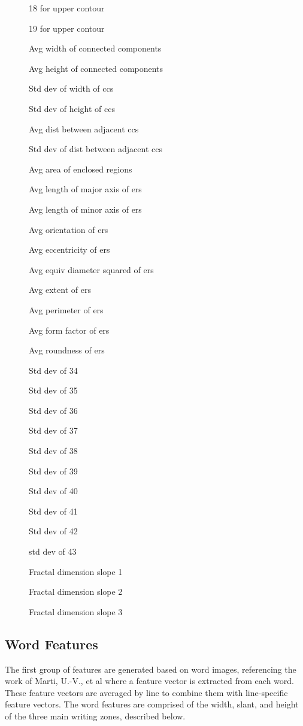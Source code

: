 \documentclass[paper=a4, fontsize=11pt]{scrartcl} %
\numberwithin{equation}{section} %
\numberwithin{figure}{section} %
\numberwithin{table}{section} %
\begin{document}
\begin{figure}
\begin{multicols}{3}
\begin{enumerate*}
    \item 18 for upper contour
    \item 19 for upper contour
    \item Avg width of connected components
    \item Avg height of connected components
    \item Std dev of width of ccs
    \item Std dev of height of ccs
    \item Avg dist between adjacent ccs
    \item Std dev of dist between adjacent ccs
    \item Avg area of enclosed regions
    \item Avg length of major axis of ers
    \item Avg length of minor axis of ers
    \item Avg orientation of ers
    \item Avg eccentricity of ers
    \item Avg equiv diameter squared of ers
    \item Avg extent of ers
    \item Avg perimeter of ers
    \item Avg form factor of ers
    \item Avg roundness of ers
    \item Std dev of 34
    \item Std dev of 35
    \item Std dev of 36
    \item Std dev of 37
    \item Std dev of 38
    \item Std dev of 39
    \item Std dev of 40
    \item Std dev of 41
    \item Std dev of 42
    \item std dev of 43
    \item Fractal dimension slope 1
    \item Fractal dimension slope 2
    \item Fractal dimension slope 3
    \end{enumerate*}
  \end{multicols}
\end{figure}

\subsection{Word Features}
The first group of features are generated based on word images,
referencing the work of Marti, U.-V., et al \cite{WriterID} where a
feature vector is extracted from each word. These feature vectors are
averaged by line to combine them with line-specific feature
vectors. The word features are comprised of the width, slant, and height of the three main writing zones, described below. 
\end{document}
